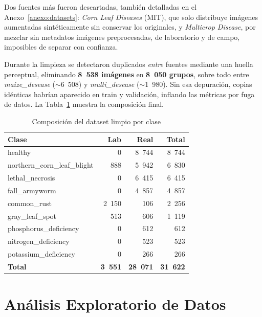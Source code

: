 \documentclass[12pt,letterpaper]{article}
\begin{document}
Dos fuentes m\'as fueron descartadas, tambi\'en detalladas en el Anexo~\ref{anexo:datasets}: \textit{Corn Leaf Diseases} (MIT), que solo distribuye im\'agenes aumentadas sint\'eticamente sin conservar los originales, y \textit{Multicrop Disease}, por mezclar sin metadatos im\'agenes preprocesadas, de laboratorio y de campo, imposibles de separar con confianza.

Durante la limpieza se detectaron duplicados \emph{entre} fuentes mediante una huella perceptual, eliminando \textbf{8~538 im\'agenes} en \textbf{8~050 grupos}, sobre todo entre \textit{maize\_desease} ($\sim$6~508) y \textit{multi\_desease} ($\sim$1~980). Sin esa depuraci\'on, copias id\'enticas habr\'ian aparecido en train y validaci\'on, inflando las m\'etricas por fuga de datos. La Tabla~\ref{tab:classes} muestra la composici\'on final.

\begin{table}[H]
\caption{Composici\'on del dataset limpio por clase}
\label{tab:classes}
\centering
\small
\begin{singlespace}
\begin{tabular}{lrrr}
\toprule
\textbf{Clase} & \textbf{Lab} & \textbf{Real} & \textbf{Total} \\
\midrule
healthy & 0 & 8~744 & 8~744 \\
northern\_corn\_leaf\_blight & 888 & 5~942 & 6~830 \\
lethal\_necrosis & 0 & 6~415 & 6~415 \\
fall\_armyworm & 0 & 4~857 & 4~857 \\
common\_rust & 2~150 & 106 & 2~256 \\
gray\_leaf\_spot & 513 & 606 & 1~119 \\
phosphorus\_deficiency & 0 & 612 & 612 \\
nitrogen\_deficiency & 0 & 523 & 523 \\
potassium\_deficiency & 0 & 266 & 266 \\
\midrule
\textbf{Total} & \textbf{3~551} & \textbf{28~071} & \textbf{31~622} \\
\bottomrule
\end{tabular}
\end{singlespace}
\end{table}

\section{An\'alisis Exploratorio de Datos}
\label{sec:eda}
\end{document}
